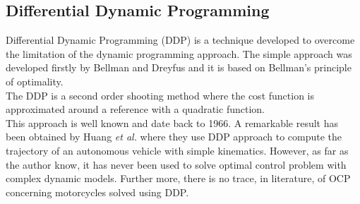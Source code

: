 \subsection{Differential Dynamic Programming}
%
Differential Dynamic Programming (DDP) is a technique developed to overcome the limitation of the dynamic programming approach. The simple approach was developed firstly by Bellman and Dreyfus and it is based on Bellman's principle of optimality.\cite{bellman2015applied}\\
The DDP is a second order shooting method where the cost function is approximated around a reference with a quadratic function.\cite{mayne1966second}\\ 
This approach is well known and date back to 1966. A remarkable result has been obtained by Huang \textit{et al.}\cite{huang2014trajectory} where they use DDP approach to compute the trajectory of an autonomous vehicle with simple kinematics. However, as far as the author know, it has never been used to solve optimal control problem with complex dynamic models. Further more, there is no trace, in literature, of OCP concerning motorcycles solved using DDP.
%